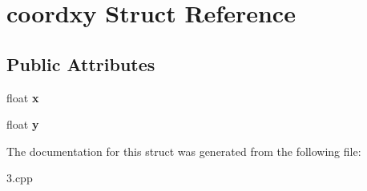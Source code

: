 \hypertarget{structcoordxy}{\section{coordxy \-Struct \-Reference}
\label{structcoordxy}
}
\subsection*{\-Public \-Attributes}
\begin{DoxyCompactItemize}
\item 
\hypertarget{structcoordxy_acd3195990636b766f0491b6e81017270}{float {\bfseries x}}\label{structcoordxy_acd3195990636b766f0491b6e81017270}

\item 
\hypertarget{structcoordxy_aebdff41023f30d74908635adebc3e807}{float {\bfseries y}}\label{structcoordxy_aebdff41023f30d74908635adebc3e807}

\end{DoxyCompactItemize}


\-The documentation for this struct was generated from the following file\-:\begin{DoxyCompactItemize}
\item 
3.\-cpp\end{DoxyCompactItemize}
